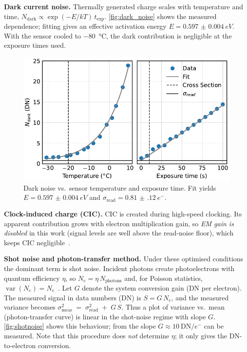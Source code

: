 \documentclass[
	a4paper,
]{scrarticle}
\begin{document}
\textbf{Dark current noise.}
Thermally generated charge scales with temperature and time,
\(N_\text{dark}\propto \exp(-E/kT)\,t_\text{exp}\).
\autoref{fig:dark_noise} shows the measured dependence; fitting gives an effective activation energy \(E=\SI{0.597(4)}{eV}\).
With the sensor cooled to \SI{-80}{\degreeCelsius}, the dark contribution is negligible at the exposure times used.

\begin{figure}[h]
    \centering
    \includegraphics{../analysis/figures/dark_noise.pdf}
    \caption{Dark noise vs.\ sensor temperature and exposure time. Fit yields \(E=\SI{0.597(4)}{eV}\) and \(\sigma_{\text{read}}=\SI{0.81(12)}{e^{-}}\).}
    \label{fig:dark_noise}
\end{figure}

\textbf{Clock-induced charge (CIC).}
CIC is created during high-speed clocking.
Its apparent contribution grows with electron multiplication gain, so \emph{EM gain is disabled} in this work (signal levels are well above the read-noise floor), which keeps CIC negligible~\cite{andorEstablishingSensitivityScientifica}.

\textbf{Shot noise and photon-transfer method.}
Under these optimised conditions the dominant term is shot noise.
Incident photons create photoelectrons with quantum efficiency \(\eta\), so \(N_e=\eta\,N_{\text{photons}}\) and, for Poisson statistics, \(\operatorname{var}(N_e)=N_e\)~\cite{europeanmachinevisionassociationStandardCharacterizationImage2010}.
Let \(G\) denote the system conversion gain (DN per electron). The measured signal in data numbers (DN) is \(S = G\,N_e\), and the measured variance becomes \(\sigma^2_{\text{meas}} \;=\; \sigma_{\text{read}}^2 \;+\; G\,S\).
Thus a plot of variance vs.\ mean (photon-transfer curve) is linear in the shot-noise regime with slope \(G\).
\autoref{fig:shotnoise} shows this behaviour; from the slope \(G \approx 10~\text{DN}/e^{-}\) can be measured.
Note that this procedure does \emph{not} determine \(\eta\); it only gives the DN-to-electron conversion.
\end{document}
